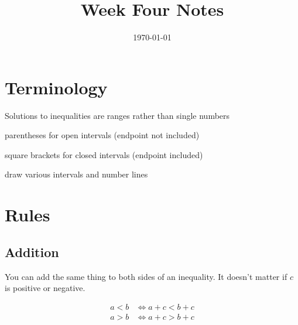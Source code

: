 \documentclass[letterpaper, landscape]{exam}
\title{Week Four Notes}
\author{}
\date{\today}
\begin{document}
  \maketitle

  \section{Terminology}

  Solutions to inequalities are ranges rather than single numbers
  \begin{itemize*}
    \item parentheses for open intervals (endpoint not included)
    \item square brackets for closed intervals (endpoint included)
    \item draw various intervals and number lines
  \end{itemize*}

  \section{Rules} %
  
  \subsection{Addition} %

  You can add the same thing to both sides of an inequality. It doesn't matter if $c$ is positive or
  negative.

  \begin{align*}
    a < b & \iff a + c < b + c \\
    a > b & \iff a + c > b + c \\
  \end{align*}
    
\end{document}
